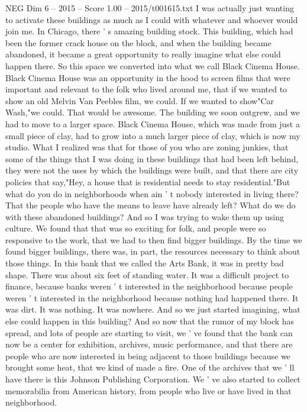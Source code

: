 \begin{textsample}{NEG Dim 6 – 2015 – Score 1.00 – 2015/t001615.txt}
I was actually just wanting to activate these buildings as much as I could with whatever and whoever would join me.
In Chicago, there ' s amazing building stock.
This building, which had been the former crack house on the block, and when the building became abandoned, it became a great opportunity to really imagine what else could happen there.
So this space we converted into what we call Black Cinema House.
Black Cinema House was an opportunity in the hood to screen films that were important and relevant to the folk who lived around me, that if we wanted to show an old Melvin Van Peebles film, we could.
If we wanted to show"Car Wash,"we could.
That would be awesome.
The building we soon outgrew, and we had to move to a larger space.
Black Cinema House, which was made from just a small piece of clay, had to grow into a much larger piece of clay, which is now my studio.
What I realized was that for those of you who are zoning junkies, that some of the things that I was doing in these buildings that had been left behind, they were not the uses by which the buildings were built, and that there are city policies that say,"Hey, a house that is residential needs to stay residential."But what do you do in neighborhoods when ain ' t nobody interested in living there?
That the people who have the means to leave have already left?
What do we do with these abandoned buildings?
And so I was trying to wake them up using culture.
We found that that was so exciting for folk, and people were so responsive to the work, that we had to then find bigger buildings.
By the time we found bigger buildings, there was, in part, the resources necessary to think about those things.
In this bank that we called the Arts Bank, it was in pretty bad shape.
There was about six feet of standing water.
It was a difficult project to finance, because banks weren ' t interested in the neighborhood because people weren ' t interested in the neighborhood because nothing had happened there.
It was dirt.
It was nothing.
It was nowhere.
And so we just started imagining, what else could happen in this building?
And so now that the rumor of my block has spread, and lots of people are starting to visit, we ' ve found that the bank can now be a center for exhibition, archives, music performance, and that there are people who are now interested in being adjacent to those buildings because we brought some heat, that we kind of made a fire.
One of the archives that we ' ll have there is this Johnson Publishing Corporation.
We ' ve also started to collect memorabilia from American history, from people who live or have lived in that neighborhood.

\end{textsample}
